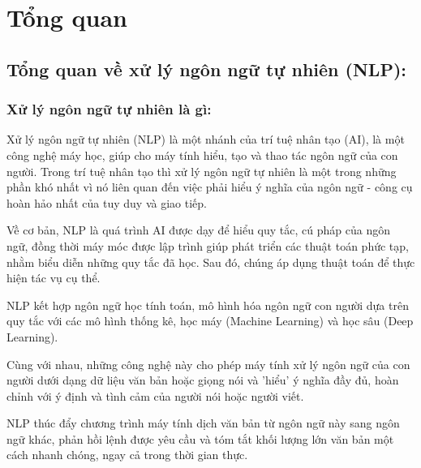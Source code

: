 \setlength{\headheight}{14.93912pt}  %
\addtolength{\topmargin}{-2.93912pt} %

\pagestyle{fancy} 

\fancyhf{}  %

\fancyfoot[C]{\thepage}  %

\chapter[Tổng quan]{\centering Tổng quan}

\section{Tổng quan về xử lý ngôn ngữ tự nhiên (NLP):}
\subsection{Xử lý ngôn ngữ tự nhiên là gì:}
Xử lý ngôn ngữ tự nhiên (NLP) là một nhánh của trí tuệ nhân tạo (AI), là một công nghệ máy học, giúp cho máy tính hiểu, tạo và thao tác ngôn ngữ của con người. Trong trí tuệ nhân tạo thì xử lý ngôn ngữ tự nhiên là một trong những phần khó nhất vì nó liên quan đến việc phải hiểu ý nghĩa của ngôn ngữ - công cụ hoàn hảo nhất của tuy duy và giao tiếp.

Về cơ bản, NLP là quá trình AI được dạy để hiểu quy tắc, cú pháp của ngôn ngữ, đồng thời máy móc được lập trình giúp phát triển các thuật toán phức tạp, nhằm biểu diễn những quy tắc đã học. Sau đó, chúng áp dụng thuật toán để thực hiện tác vụ cụ thể.

NLP kết hợp ngôn ngữ học tính toán, mô hình hóa ngôn ngữ con người dựa trên quy tắc với các mô hình thống kê, học máy (Machine Learning) và học sâu (Deep Learning).

Cùng với nhau, những công nghệ này cho phép máy tính xử lý ngôn ngữ của con người dưới dạng dữ liệu văn bản hoặc giọng nói và 'hiểu' ý nghĩa đầy đủ, hoàn chỉnh với ý định và tình cảm của người nói hoặc người viết.

NLP thúc đẩy chương trình máy tính dịch văn bản từ ngôn ngữ này sang ngôn ngữ khác, phản hồi lệnh được yêu cầu và tóm tắt khối lượng lớn văn bản một cách nhanh chóng, ngay cả trong thời gian thực.

